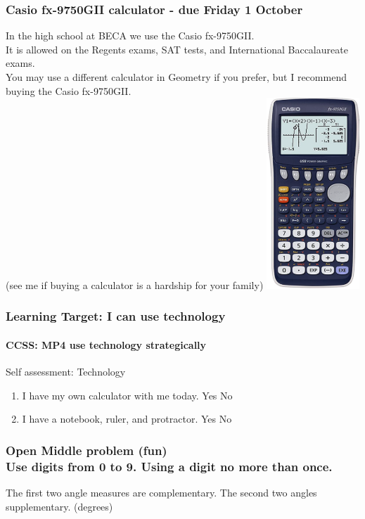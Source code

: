 \documentclass{beamer}
\begin{document}
  \frame
  {
    \frametitle{Casio fx-9750GII calculator - due Friday 1 October}
    \begin{multicols}{2}
    In the high school at BECA we use the Casio fx-9750GII.\\[5pt] 
    It is allowed on the Regents exams, SAT tests, and International Baccalaureate exams.\\[5pt]
    You may use a different calculator in Geometry if you prefer, but I recommend buying the Casio fx-9750GII.\\[5pt]
    (see me if buying a calculator is a hardship for your family)
    \includegraphics[width=3.5cm]{casio_fx-9750GII.png}
    \end{multicols}
  }

  \frame
  {
    \frametitle{Learning Target: I can use technology}
    \framesubtitle{CCSS: MP4 use technology strategically}
  
    \begin{block}{Self assessment: Technology}
      
      \begin{enumerate}
      \item I have my own calculator with me today. Yes \qquad No
      \item I have a notebook, ruler, and protractor. Yes \qquad No
      \end{enumerate}
    \end{block}
  }

  \frame
  {
    \frametitle{Open Middle problem (fun) \\
    Use digits from 0 to 9. Using a digit no more than once.}
      The first two angle measures are complementary. The second two angles supplementary. (degrees)\\[0.75cm]
         \vspace{5cm} 
  }
\end{document}
